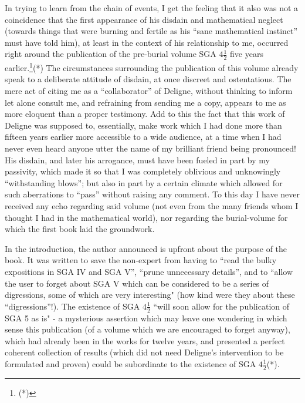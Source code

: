 In trying to learn from the chain of events, I get the feeling that it also was not a
coincidence that the first appearance of his disdain and mathematical neglect (towards
things that were burning and fertile as his ``sane mathematical instinct'' must have told
him), at least in the context of his relationship to me, occurred right around the
publication of the pre-burial volume SGA $4\frac{1}{2}$ five years
earlier.\footnote{(*)}(*)
The circumstances surrounding the publication of this volume 
already speak to a deliberate attitude of disdain, at once discreet and ostentatious. 
The mere act of citing me as a ``collaborator'' of Deligne, without thinking to inform
let alone consult me, and refraining from sending me a copy, 
appears to me as more eloquent than a proper testimony. 
Add to this the fact that this work of Deligne was supposed to, essentially, make 
work which I had done more than fifteen years earlier
more accessible to a wide audience, at a time when I had never even
heard anyone utter the name of my brilliant friend being pronounced!
His disdain, and later his arrogance, must have been fueled in part by my passivity,
which made it so that I was completely oblivious and unknowingly 
``withstanding blows''; but also in part by a certain climate which allowed for such
aberrations to ``pass'' without raising any comment. 
To this day I have never received any echo regarding said volume (not even from the many
friends whom I thought I had in the mathematical world), 
nor regarding the burial-volume for which the first book laid the groundwork. 

In the introduction, the author announced is upfront about the purpose of the book.
It was written to save the non-expert from having to ``read the bulky expositions in 
SGA IV and SGA V'', 
``prune unnecessary details'',
and to ``allow the user to forget about SGA V which can be considered 
to be a series of digressions, 
some of which are very interesting" (how kind were they about these ``digressions''!).
The existence of SGA $4\frac{1}{2}$ ``will soon allow for the publication of SGA 5 as is" - a
mysterious assertion which may leave one wondering in which sense this publication (of
a volume which we are encouraged to forget anyway), which had already been in the works
for twelve years, and presented a perfect coherent collection of results 
(which did not need Deligne's intervention to be formulated and proven) could be
subordinate to the existence of SGA $4\frac{1}{2}$(*).

